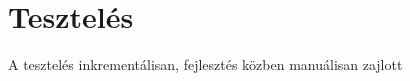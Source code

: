 \chapter{Tesztelés}
\label{ch:intro}

A tesztelés inkrementálisan, fejlesztés közben manuálisan zajlott

